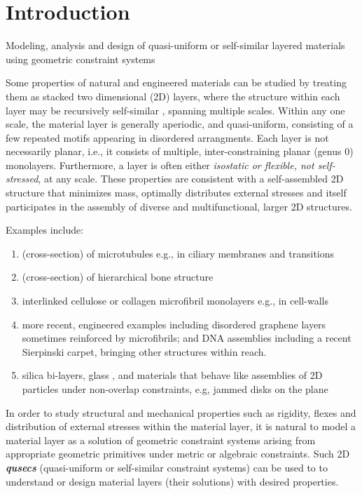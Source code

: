\section{Introduction}
\label{sec:prev}
Modeling, analysis and design of quasi-uniform or self-similar layered materials using geometric constraint systems
 
Some properties of natural and engineered materials can be studied by treating them as stacked two dimensional (2D) layers, 
where the structure within each layer may be recursively 
self-similar \cite{Intro1}, 
spanning multiple scales. Within any one scale, the material layer is generally aperiodic, and quasi-uniform,
consisting of a few repeated motifs appearing in disordered arrangments.
Each layer is not necessarily planar, i.e., it consists of multiple, inter-constraining planar (genus 0) monolayers. 
Furthermore, a layer is often  either {\sl isostatic or flexible, not self-stressed}, at any scale. These properties are
consistent with a self-assembled 2D structure that minimizes mass, optimally distributes external stresses and itself 
participates in the assembly of diverse and multifunctional, 
larger 2D structures.

Examples include:

\begin{enumerate}
    \item (cross-section) of microtubules \cite{Necklace1} e.g., in ciliary membranes and transitions \cite{Necklace2}
    \item (cross-section) of hierarchical bone structure \cite{XX}
    \item interlinked cellulose or collagen microfibril monolayers e.g., in cell-walls \cite{CellWalls1} \cite{CellWalls1}
    \item more recent, engineered examples including  disordered graphene layers \cite{Graphene1} \cite{Graphene2} sometimes reinforced 
    by  microfibrils; and DNA assemblies \cite{Microfibrils1} including a recent Sierpinski carpet, bringing other structures 
    \cite{Microfibrils2} within reach.
    \item  silica bi-layers, glass \cite{SilicaGlass1} \cite{SilicaGlass2}, and materials that behave like assemblies of 
    2D particles under non-overlap constraints, e.g, jammed 
    disks on the plane \cite{JammedDisk1}
%
\end{enumerate}
%
In order to study structural and mechanical properties such as rigidity, flexes and distribution of external stresses 
within the material layer, it is natural to model a material layer as a solution of geometric constraint systems 
arising from appropriate geometric primitives under metric or algebraic constraints. 
Such  2D {\bf{\em qusecs}} (quasi-uniform or self-similar constraint systems) can be used to 
to understand or design material layers (their solutions) with desired properties.
%
